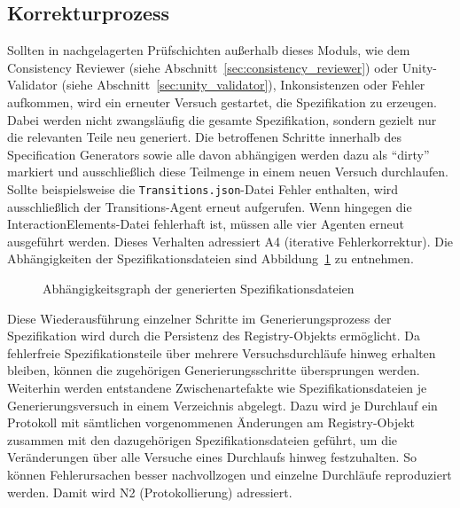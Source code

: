 \subsection*{Korrekturprozess}

Sollten in nachgelagerten Prüfschichten außerhalb dieses Moduls, wie dem Consistency Reviewer (siehe Abschnitt~\ref{sec:consistency_reviewer}) oder Unity-Validator (siehe Abschnitt~\ref{sec:unity_validator}), Inkonsistenzen oder Fehler aufkommen, wird ein erneuter Versuch gestartet, die Spezifikation zu erzeugen. Dabei werden nicht zwangsläufig die gesamte Spezifikation, sondern gezielt nur die relevanten Teile neu generiert. Die betroffenen Schritte innerhalb des Specification Generators sowie alle davon abhängigen werden dazu als \enquote{dirty} markiert und ausschließlich diese Teilmenge in einem neuen Versuch durchlaufen. Sollte beispielsweise die \texttt{Transitions.json}-Datei Fehler enthalten, wird ausschließlich der Transitions-Agent erneut aufgerufen. Wenn hingegen die InteractionElements-Datei fehlerhaft ist, müssen alle vier Agenten erneut ausgeführt werden. Dieses Verhalten adressiert A4 (iterative Fehlerkorrektur). Die Abhängigkeiten der Spezifikationsdateien sind Abbildung~\ref{fig:dependency_graph_specgen} zu entnehmen.

\begin{figure}[htbp]
  \centering
  \caption{Abhängigkeitsgraph der generierten Spezifikationsdateien}\label{fig:dependency_graph_specgen}
\end{figure}

Diese Wiederausführung einzelner Schritte im Generierungsprozess der Spezifikation wird durch die Persistenz des Registry-Objekts ermöglicht. Da fehlerfreie Spezifikationsteile über mehrere Versuchsdurchläufe hinweg erhalten bleiben, können die zugehörigen Generierungsschritte übersprungen werden. Weiterhin werden entstandene Zwischenartefakte wie Spezifikationsdateien je Generierungsversuch in einem Verzeichnis abgelegt. Dazu wird je Durchlauf ein Protokoll mit sämtlichen vorgenommenen Änderungen am Registry-Objekt zusammen mit den dazugehörigen Spezifikationsdateien geführt, um die Veränderungen über alle Versuche eines Durchlaufs hinweg festzuhalten. So können Fehlerursachen besser nachvollzogen und einzelne Durchläufe reproduziert werden. Damit wird N2 (Protokollierung) adressiert.

